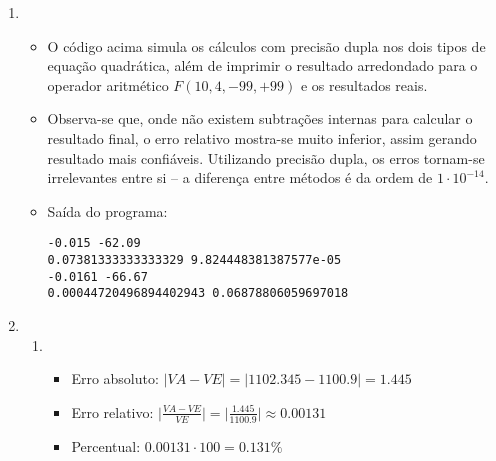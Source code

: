 \documentclass{article}
\newenvironment{arabenum}{
    \begin{enumerate}[label=\textbf{\arabic*})]
}{
    \end{enumerate}
}
\newenvironment{alphenum}{
    \begin{enumerate}[label=(\alph*)]
}{
    \end{enumerate}
}
\newenvironment{discusscode}[1]{
    
    \vspace{-2mm}
    \begin{itemize}
}{
    \end{itemize}
}
\begin{document}
\begin{arabenum}
\begin{discusscode}{div_by_zero.py}
\begin{verbatim}
-0.0000000000000001110223024625156540423631668090820312500
-0.0000000000000001110223024625156540423631668090820312500

1.0000000000000000000000000000000000000000000000000000000
1.0000000000000000000000000000000000000000000000000000000\end{verbatim}

\end{discusscode}

\item \begin{discusscode}{quadratic.py}

\item O código acima simula os cálculos com precisão dupla nos dois tipos de
equação quadrática, além de imprimir o resultado arredondado para o operador
aritmético $F(10, 4, -99, +99)$ e os resultados reais.

\item Observa-se que, onde não existem subtrações internas para
calcular o resultado final, o erro relativo mostra-se muito inferior,
assim gerando resultado mais confiáveis. Utilizando precisão dupla,
os erros tornam-se irrelevantes entre si -- a diferença entre métodos
é da ordem de $1 \cdot 10^{-14}$.

\item Saída do programa:

\begin{verbatim}
-0.015 -62.09
0.07381333333333329 9.824448381387577e-05
-0.0161 -66.67
0.00044720496894402943 0.06878806059697018
\end{verbatim}

\end{discusscode}

\item \begin{alphenum}

\item \begin{itemize}

\item Erro absoluto: $\vert VA - VE \vert = \vert 1102.345 - 1100.9 \vert
= \boldsymbol{1.445}$

\item Erro relativo: $\big\vert\frac{VA - VE}{VE}\big\vert
= \big\vert\frac{1.445}{1100.9}\big\vert \approx \boldsymbol{0.00131}$

\item Percentual: $0.00131 \cdot 100 = \boldsymbol{0.131\%}$

\end{itemize}


\end{alphenum}
\end{arabenum}
\end{document}
